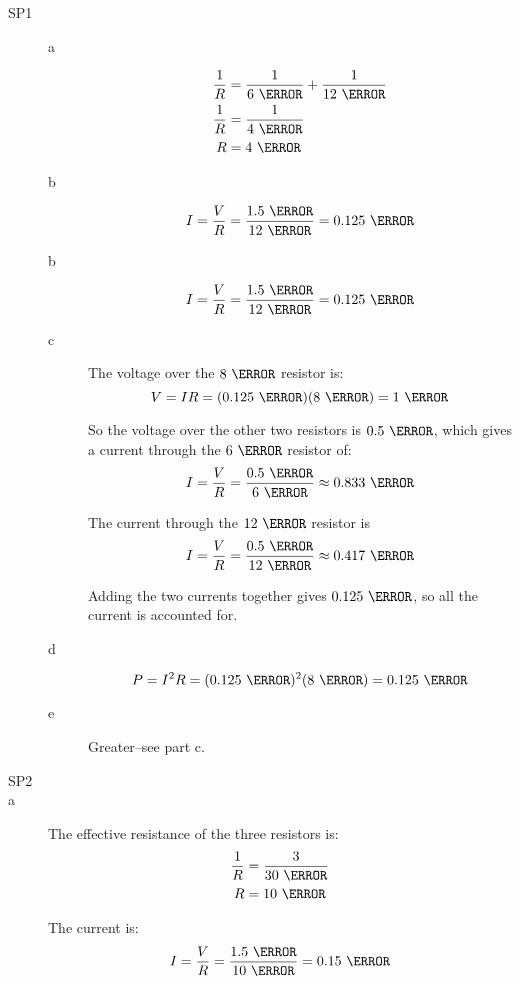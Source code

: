 \documentclass{exam}
\begin{document}
\begin{description}
\item[SP1]

\begin{description}
\item[a]
\begin{align*}
  \frac{1}{R} &= \frac{1}{6 \ \ohm} + \frac{1}{12 \ \ohm} \\
  \frac{1}{R} &= \frac{1}{4 \ \ohm} \\
  R &= 4 \ \ohm \\
\end{align*}

\item[b]
\[
  I = \frac{V}{R} = \frac{1.5 \ \volt}{12 \ \ohm} = 0.125 \ \ampere
\]

\item[b]
\[
  I = \frac{V}{R} = \frac{1.5 \ \volt}{12 \ \ohm} = 0.125 \ \ampere
\]

\item[c]
The voltage over the $8 \ \ohm$ resistor is:
\[
  V = IR = (0.125 \ \ohm)(8 \ \ohm) = 1 \ \volt
\]

So the voltage over the other two resistors is $0.5 \ \volt$, which gives a current through the $6 \ \ohm$ resistor of:
\[
  I = \frac{V}{R} = \frac{0.5 \ \volt}{6 \ \ohm} \approx 0.833 \ \ampere
\]

The current through the $12 \ \ohm$ resistor is
\[
  I = \frac{V}{R} = \frac{0.5 \ \volt}{12 \ \ohm} \approx 0.417 \ \ampere
\]

Adding the two currents together gives $0.125 \ \ampere$, so all the current is accounted for.

\item[d]
\[
  P = I^2R = (0.125 \ \ampere)^2(8 \ \ohm) = 0.125 \ \watt
\]

\item[e]
Greater--see part c.

\end{description}

\item[SP2]
\item[a]
The effective resistance of the three resistors is:
\begin{align*}
  \frac{1}{R} &= \frac{3}{30 \ \ohm} \\
  R &= 10 \ \ohm \\
\end{align*}

The current is:
\[
  I = \frac{V}{R} = \frac{1.5 \ \volt}{10 \ \ohm} = 0.15 \ \ampere
\]


\end{description}
\end{document}
